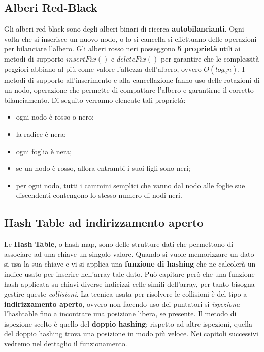 \subsection{Alberi Red-Black}
Gli alberi red black sono degli alberi binari di ricerca
\textbf{autobilancianti}. Ogni volta che si inserisce un nuovo 
nodo, o lo 
si cancella si effettuano delle operazioni per bilanciare 
l'albero. Gli alberi rosso neri posseggono \textbf{5 propriet\`a} 
utili
ai metodi di supporto $insertFix()$ e $deleteFix()$ per garantire che le complessit\`a
peggiori abbiano al pi\`u come valore l'altezza dell'albero, ovvero $O(log_2n)$. 
I metodi di supporto all'inserimento e alla cancellazione fanno uso delle rotazioni di un nodo,
operazione che permette di compattare l'albero e garantirne il corretto bilanciamento.
Di seguito verranno elencate tali propriet\`a:
\begin{itemize}
    \item ogni nodo \`e rosso o nero;
    \item la radice \`e nera;
    \item ogni foglia \`e nera;
    \item se un nodo \`e rosso, allora entrambi i suoi figli sono neri;
    \item per ogni nodo, tutti i cammini semplici che vanno dal nodo alle foglie sue discendenti
    contengono lo stesso numero di nodi neri.
\end{itemize}

\subsection{Hash Table ad indirizzamento aperto}
Le \textbf{Hash Table}, o hash map, sono delle strutture dati che permettono di associare ad una
chiave un singolo valore. Quando si vuole memorizzare un dato
si usa la sua chiave e vi si applica una \textbf{funzione di hashing} che ne calcoler\`a un indice usato per inserire nell'array tale dato. Pu\`o capitare per\`o che una funzione hash applicata su chiavi diverse 
indicizzi celle simili dell'array, per tanto bisogna gestire queste \textit{collisioni}.
La tecnica usata per risolvere le collisioni \`e del tipo a \textbf{indirizzamento aperto}, ovvero non facendo
uso dei puntatori si \textit{ispeziona} l'hashtable fino a incontrare una posizione libera,
se presente. Il metodo di ispezione scelto \`e quello del \textbf{doppio hashing}: rispetto
ad altre ispezioni, quella del doppio hashing trova una posizione in modo pi\`u veloce.
Nei capitoli successivi vedremo nel dettaglio il funzionamento.
